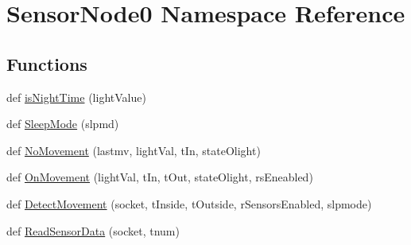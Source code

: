 \hypertarget{namespaceSensorNode0}{}\section{Sensor\+Node0 Namespace Reference}
\label{namespaceSensorNode0}
\subsection*{Functions}
\begin{DoxyCompactItemize}
\item 
def \hyperlink{namespaceSensorNode0_acebf4f2262d99cf53409e57f8018fb80}{is\+Night\+Time} (light\+Value)
\item 
def \hyperlink{namespaceSensorNode0_af6220b8b1116262731410676440f7e3f}{Sleep\+Mode} (slpmd)
\item 
def \hyperlink{namespaceSensorNode0_a6adf2f38d28053fb7d9d8b9ef3ef7524}{No\+Movement} (lastmv, light\+Val, t\+In, state\+Olight)
\item 
def \hyperlink{namespaceSensorNode0_ac43f766b9b1117ce6520080a80f7cb88}{On\+Movement} (light\+Val, t\+In, t\+Out, state\+Olight, rs\+Eneabled)
\item 
def \hyperlink{namespaceSensorNode0_abfecbd15467837166bc1c24a5d5be99d}{Detect\+Movement} (socket, t\+Inside, t\+Outside, r\+Sensors\+Enabled, slpmode)
\item 
def \hyperlink{namespaceSensorNode0_ac9f0551e56fe21523c6070f32e6b9b14}{Read\+Sensor\+Data} (socket, tnum)
\end{DoxyCompactItemize}
